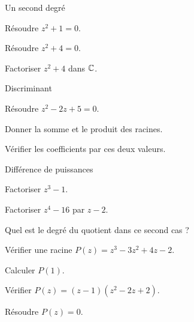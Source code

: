 \exercices
{}
\begingroup\renewcommand{\otBesoinPlace}[1]{}\begin{minipage}{\linewidth}
\begin{exercice}[1]{Un second degré}

\begin{questions}
\item Résoudre $z^2+1=0$.
\item Résoudre $z^2+4=0$.
\item Factoriser $z^2+4$ dans $\mathbb{C}$.
\end{questions}
\end{exercice}
\begin{exercice}[1]{Discriminant}

\begin{questions}
\item Résoudre $z^2-2z+5=0$.
\item Donner la somme et le produit des racines.
\item Vérifier les coefficients par ces deux valeurs.
\end{questions}
\end{exercice}
\begin{exercice}[1]{Différence de puissances}

\begin{questions}
\item Factoriser $z^3-1$.
\item Factoriser $z^4-16$ par $z-2$.
\item Quel est le degré du quotient dans ce second cas ?
\end{questions}
\end{exercice}
\begin{exercice}[1]{Vérifier une racine}
$P(z)=z^3-3z^2+4z-2$.
\begin{questions}
\item Calculer $P(1)$.
\item Vérifier $P(z)=(z-1)(z^2-2z+2)$.
\item Résoudre $P(z)=0$.
\end{questions}
\end{exercice}
\end{minipage}\endgroup
\clearpage
{}
